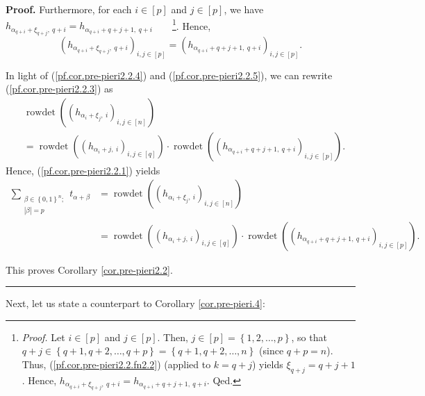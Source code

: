 \documentclass
[numbers=enddot,12pt,final,onecolumn,notitlepage,english]{scrartcl}%
\theoremstyle{definition}
\newenvironment{proof}[1][Proof]{\noindent\textbf{#1.} }{\ \rule{0.5em}{0.5em}}
\let\sumnonlimits\sum
\renewcommand{\sum}{\sumnonlimits\limits}
\newenvironment{verlong}{}{}
\begin{document}
\begin{proof}
\begin{verlong}
Furthermore, for each $i\in\left[  p\right]  $ and $j\in\left[  p\right]  $,
we have $h_{\alpha_{q+i}+\xi_{q+j},\ q+i}=h_{\alpha_{q+i}+q+j+1,\ q+i}%
$\ \ \ \ \footnote{\textit{Proof.} Let $i\in\left[  p\right]  $ and
$j\in\left[  p\right]  $. Then, $j\in\left[  p\right]  =\left\{
1,2,\ldots,p\right\}  $, so that $q+j\in\left\{  q+1,q+2,\ldots,q+p\right\}
=\left\{  q+1,q+2,\ldots,n\right\}  $ (since $q+p=n$). Thus,
(\ref{pf.cor.pre-pieri2.2.fn2.2}) (applied to $k=q+j$) yields $\xi
_{q+j}=q+j+1$. Hence, $h_{\alpha_{q+i}+\xi_{q+j},\ q+i}=h_{\alpha
_{q+i}+q+j+1,\ q+i}$. Qed.}. Hence,%
\begin{equation}
\left(  h_{\alpha_{q+i}+\xi_{q+j},\ q+i}\right)  _{i,j\in\left[  p\right]
}=\left(  h_{\alpha_{q+i}+q+j+1,\ q+i}\right)  _{i,j\in\left[  p\right]  }.
\label{pf.cor.pre-pieri2.2.5}%
\end{equation}


In light of (\ref{pf.cor.pre-pieri2.2.4}) and (\ref{pf.cor.pre-pieri2.2.5}),
we can rewrite (\ref{pf.cor.pre-pieri2.2.3}) as%
\begin{align*}
&  \operatorname*{rowdet}\left(  \left(  h_{\alpha_{i}+\xi_{j},\ i}\right)
_{i,j\in\left[  n\right]  }\right) \\
&  =\operatorname*{rowdet}\left(  \left(  h_{\alpha_{i}+j,\ i}\right)
_{i,j\in\left[  q\right]  }\right)  \cdot\operatorname*{rowdet}\left(  \left(
h_{\alpha_{q+i}+q+j+1,\ q+i}\right)  _{i,j\in\left[  p\right]  }\right)  .
\end{align*}
Hence, (\ref{pf.cor.pre-pieri2.2.1}) yields%
\begin{align*}
\sum_{\substack{\beta\in\left\{  0,1\right\}  ^{n};\\\left\vert \beta
\right\vert =p}}t_{\alpha+\beta}  &  =\operatorname*{rowdet}\left(  \left(
h_{\alpha_{i}+\xi_{j},\ i}\right)  _{i,j\in\left[  n\right]  }\right) \\
&  =\operatorname*{rowdet}\left(  \left(  h_{\alpha_{i}+j,\ i}\right)
_{i,j\in\left[  q\right]  }\right)  \cdot\operatorname*{rowdet}\left(  \left(
h_{\alpha_{q+i}+q+j+1,\ q+i}\right)  _{i,j\in\left[  p\right]  }\right)  .
\end{align*}

\end{verlong}

\noindent This proves Corollary \ref{cor.pre-pieri2.2}.
\end{proof}

Next, let us state a counterpart to Corollary \ref{cor.pre-pieri.4}:
\end{document}

